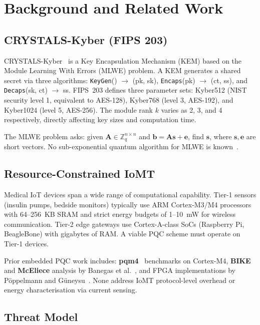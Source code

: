 \documentclass[10pt,journal,compsoc]{IEEEtran}
\begin{document}
\section{Background and Related Work}
\label{sec:background}

\subsection{CRYSTALS-Kyber (FIPS 203)}

CRYSTALS-Kyber~\cite{bos2018crystals} is a Key Encapsulation
Mechanism (KEM) based on the Module Learning With Errors (MLWE)
problem.
A KEM generates a shared secret via three algorithms:
\texttt{KeyGen}() $\to$ (pk, sk),
\texttt{Encaps}(pk) $\to$ (ct, ss), and
\texttt{Decaps}(sk, ct) $\to$ ss.
FIPS~203 defines three parameter sets:
Kyber512 (NIST security level 1, equivalent to AES-128),
Kyber768 (level 3, AES-192), and Kyber1024 (level 5, AES-256).
The module rank $k$ varies as 2, 3, and 4 respectively,
directly affecting key sizes and computation time.

The MLWE problem asks: given $\mathbf{A} \in \mathbb{Z}_q^{n \times n}$
and $\mathbf{b} = \mathbf{As} + \mathbf{e}$, find $\mathbf{s}$,
where $\mathbf{s}, \mathbf{e}$ are short vectors.
No sub-exponential quantum algorithm for MLWE is known~\cite{peikert2016decade}.

\subsection{Resource-Constrained IoMT}

Medical IoT devices span a wide range of computational capability.
Tier-1 sensors (insulin pumps, bedside monitors) typically use
ARM Cortex-M3/M4 processors with 64--256~KB SRAM and strict
energy budgets of 1--10~mW for wireless communication.
Tier-2 edge gateways use Cortex-A-class SoCs (Raspberry Pi, BeagleBone)
with gigabytes of RAM.
A viable PQC scheme must operate on Tier-1 devices.

Prior embedded PQC work includes:
\textbf{pqm4}~\cite{kannwischer2019} benchmarks on Cortex-M4,
\textbf{BIKE} and \textbf{McEliece} analysis by Banegas et
al.~\cite{banegas2021},
and FPGA implementations by Pöppelmann and Güneysu~\cite{poppelmann2014}.
None address IoMT protocol-level overhead or energy characterisation
via current sensing.

\subsection{Threat Model}
\end{document}
